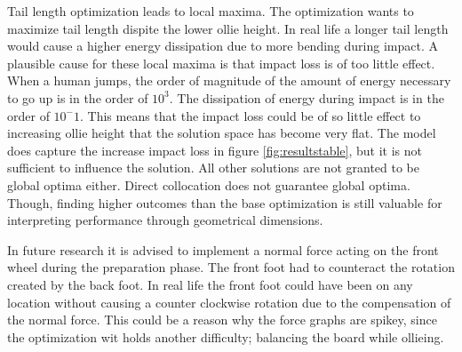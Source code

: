 \documentclass[default,iicol]{sn-jnl}
\begin{document}
Tail length optimization leads to local maxima. The optimization wants to maximize tail length dispite the lower ollie height. In real life a longer tail length would cause a higher energy dissipation due to more bending during impact. A plausible cause for these local maxima is that impact loss is of too little effect. When a human jumps, the order of magnitude of the amount of energy necessary to go up is in the order of $10^3$. The dissipation of energy during impact is in the order of $10^-1$. This means that the impact loss could be of so little effect to increasing ollie height that the solution space has become very flat. The model does capture the increase impact loss in figure \ref{fig:resultstable}, but it is not sufficient to influence the solution. All other solutions are not granted to be global optima either. Direct collocation does not guarantee global optima. Though, finding higher outcomes than the base optimization is still valuable for interpreting performance through geometrical dimensions.

In future research it is advised to implement a normal force acting on the front wheel during the preparation phase. The front foot had to counteract the rotation created by the back foot. In real life the front foot could have been on any location without causing a counter clockwise rotation due to the compensation of the normal force. This could be a reason why the force graphs are spikey, since the optimization wit holds another difficulty; balancing the board while ollieing.
 
\end{document}
